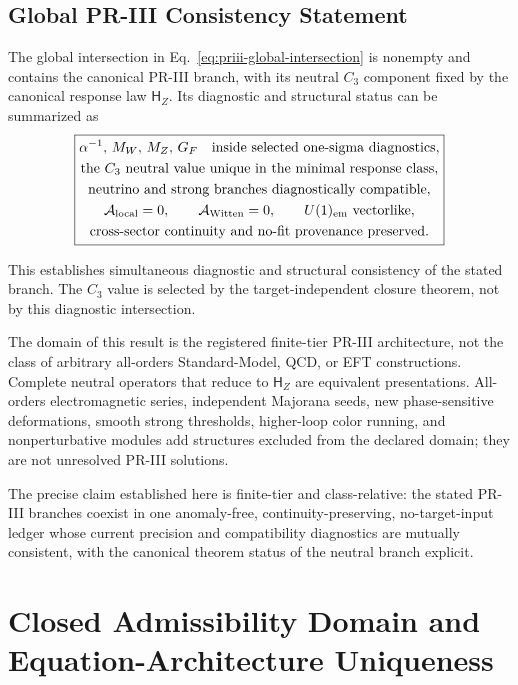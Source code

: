 \documentclass[11pt]{article}
\begin{document}
\subsection{Global PR-III Consistency Statement}
\label{subsec:priii-global-consistency-statement}

The global intersection in Eq.~\eqref{eq:priii-global-intersection} is nonempty and contains the canonical PR-III branch, with its neutral \(C_3\) component fixed by the canonical response law \(\mathsf H_Z\).  Its diagnostic and structural status can be summarized as
\begin{equation}
\boxed{
\begin{gathered}
\alpha^{-1},\,M_W,\,M_Z,\,G_F
\quad\text{inside selected one-sigma diagnostics},\\
\text{the \(C_3\) neutral value unique in the minimal response class},\\
\text{neutrino and strong branches diagnostically compatible},\\
\mathcal A_{\rm local}=0,\qquad
\mathcal A_{\rm Witten}=0,\qquad
U(1)_{\rm em}\ \text{vectorlike},\\
\text{cross-sector continuity and no-fit provenance preserved}.
\end{gathered}
}
\label{eq:priii-global-consistency-result}
\end{equation}

This establishes simultaneous diagnostic and structural consistency of the stated branch.  The \(C_3\) value is selected by the target-independent closure theorem, not by this diagnostic intersection.

The domain of this result is the registered finite-tier PR-III architecture, not the class of arbitrary all-orders Standard-Model, QCD, or EFT constructions.  Complete neutral operators that reduce to \(\mathsf H_Z\) are
equivalent presentations.  All-orders electromagnetic series, independent Majorana seeds, new phase-sensitive deformations, smooth strong thresholds, higher-loop color running, and nonperturbative modules add structures excluded from the declared domain; they are not unresolved PR-III solutions.

The precise claim established here is finite-tier and class-relative: the stated PR-III branches coexist in one anomaly-free, continuity-preserving, no-target-input ledger whose current precision and compatibility diagnostics are mutually consistent, with the canonical theorem status of the neutral branch explicit.

\section{Closed Admissibility Domain and Equation-Architecture Uniqueness}
\label{sec:priii-closed-admissibility-domain}
\end{document}

